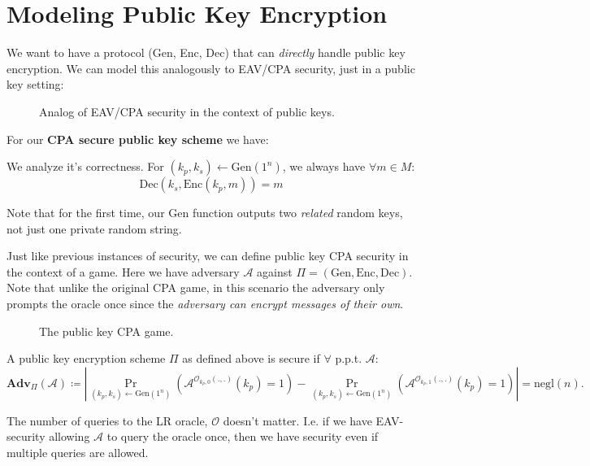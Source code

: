 \section{Modeling Public Key Encryption}
We want to have a protocol (Gen, Enc, Dec) that can \emph{directly} handle public key encryption. We can model this analogously to EAV/CPA security, just in a public key setting:

\begin{figure}[H]
	\centering
	\caption{Analog of EAV/CPA security in the context of public keys.}
	\label{fig:pubeavcpa}
\end{figure}

\begin{definition}
	For our \textbf{CPA secure public key scheme} we have:
	We analyze it's correctness. For \((k_p, k_s) \gets \mathrm{Gen}(1^n)\), we always have \(\forall m \in M\):
	\[
		\mathrm{Dec}(k_s, \mathrm{Enc}(k_p, m)) = m
	\] 
\end{definition}
\begin{remark}
	Note that for the first time, our Gen function outputs two \emph{related} random keys, not just one private random string.
\end{remark}

Just like previous instances of security, we can define public key CPA security in the context of a game. Here we have adversary \(\mathcal{A} \) against \(\Pi = (\mathrm{Gen, Enc, Dec})\). Note that unlike the original CPA game, in this scenario the adversary only prompts the oracle once since the \emph{adversary can encrypt messages of their own}.

\begin{figure}[H]
	\centering
	\caption{The public key CPA game.}
	\label{fig:pubcpasec}
\end{figure}

\begin{definition}
	A public key encryption scheme \(\Pi\) as defined above is secure if \(\forall\) p.p.t. \(\mathcal{A} \):
	\[
		\mathbf{Adv}_\Pi (\mathcal{A}) \coloneqq \left| 
			\Pr_{(k_p, k_s) \gets \mathrm{Gen}(1^n)} (\mathcal{A}^{\mathcal{O}_{k_p, 0} (.,.)}(k_p)=1) -
		  \Pr_{(k_p, k_s) \gets \mathrm{Gen}(1^n)} (\mathcal{A}^{\mathcal{O}_{k_p, 1} (.,.)}(k_p)=1)
		\right| =
		\mathrm{negl}(n).
	\]
\end{definition}
\begin{remark}
	The number of queries to the LR oracle, \(\mathcal{O} \) doesn't matter. I.e. if we have EAV-security allowing \(\mathcal{A} \) to query the oracle once, then we have security even if multiple queries are allowed.
\end{remark}

